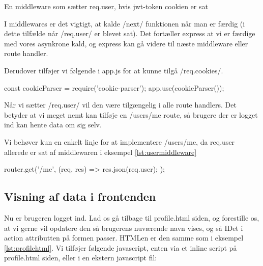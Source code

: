 \documentclass[english,course]{lecture}
\begin{document}
\begin{listing}[H]
\caption{En middleware som sætter req.user, hvis jwt-token cookien er sat}
\label{lst:usermiddleware}
\end{listing}

I middlewares er det vigtigt, at kalde \jsinline/next/ funktionen når man er færdig (i dette tilfælde når \jsinline/req.user/ er blevet sat). Det fortæller express at vi er færdige med vores asynkrone kald, og express kan gå videre til næste middleware eller route handler.

Derudover tilføjer vi følgende i app.js for at kunne tilgå \jsinline/req.cookies/.

\begin{jscode} 
const cookieParser = require('cookie-parser');
app.use(cookieParser());
\end{jscode}

Når vi sætter \jsinline/req.user/ vil den være tilgængelig i alle route handlers. Det betyder at vi meget nemt kan tilføje en /users/me route, så brugere der er logget ind kan hente data om sig selv.

\begin{listing}[H]
\caption{Vi behøver kun en enkelt linje for at implementere /users/me, da req.user allerede er sat af middlewaren i eksempel \ref{lst:usermiddleware}}
\begin{jscode}
router.get('/me', (req, res) => {    
	res.json(req.user);
});
\end{jscode}
\end{listing}

\subsection{Visning af data i frontenden}

Nu er brugeren logget ind. Lad os gå tilbage til profile.html siden, og forestille os, at vi gerne vil opdatere den så brugerens nuværende navn vises, og så IDet i action attributten på formen passer. HTMLen er den samme som i eksempel \ref{lst:profilehtml}. Vi tilføjer følgende javascript, enten via et inline script på profile.html siden, eller i en ekstern javascript fil:
\end{document}
